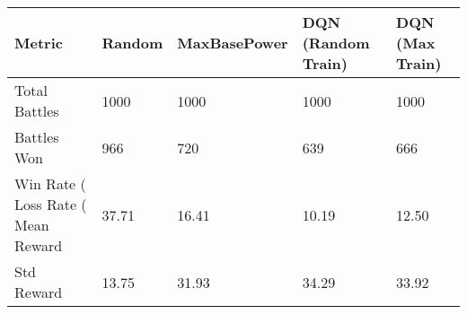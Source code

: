 \begin{tabular}{lllll}
\toprule
Metric & Random & MaxBasePower & DQN (Random Train) & DQN (Max Train) \\
\midrule
Total Battles & 1000 & 1000 & 1000 & 1000 \\
Battles Won & 966 & 720 & 639 & 666 \\
Win Rate (%
Loss Rate (%
Mean Reward & 37.71 & 16.41 & 10.19 & 12.50 \\
Std Reward & 13.75 & 31.93 & 34.29 & 33.92 \\
\bottomrule
\end{tabular}
